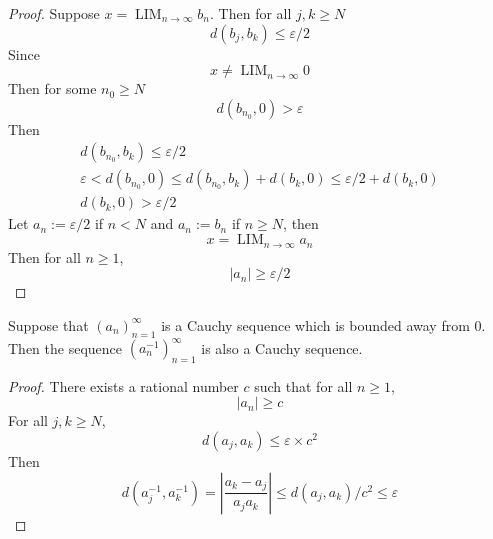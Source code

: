 \documentclass{blog}
\DeclareMathOperator{\LIM}{LIM}
\begin{document}
\begin{proof}
  Suppose $x = \LIM_{n \to \infty} b_{n}$.
  Then for all $j, k \geq N$
  \begin{equation*}
    d(b_{j}, b_{k}) \leq \varepsilon / 2
  \end{equation*}
  Since
  \begin{equation*}
    x \neq \LIM_{n \to \infty} 0
  \end{equation*}
  Then for some $n_{0} \geq N$
  \begin{equation*}
    d(b_{n_{0}}, 0) > \varepsilon
  \end{equation*}
  Then
  \begin{gather*}
    d(b_{n_{0}}, b_{k}) \leq \varepsilon / 2 \\
    \varepsilon < d(b_{n_{0}}, 0) \leq d(b_{n_{0}}, b_{k}) + d(b_{k}, 0)
    \leq \varepsilon / 2 + d(b_{k}, 0) \\
    d(b_{k}, 0) > \varepsilon / 2
  \end{gather*}
  Let $a_{n} := \varepsilon / 2$ if $n < N$ and $a_{n} := b_{n}$ if $n \geq N$, then
  \begin{equation*}
    x = \LIM_{n \to \infty} a_{n}
  \end{equation*}
  Then for all $n \geq 1$,
  \begin{equation*}
    |a_{n}| \geq \varepsilon / 2
  \end{equation*}
\end{proof}

\begin{lemma}
  Suppose that $(a_{n})_{n = 1}^{\infty}$ is a Cauchy sequence which is bounded away from 0.
  Then the sequence $(a_{n}^{-1})_{n = 1}^{\infty}$ is also a Cauchy sequence.
\end{lemma}

\begin{proof}
  There exists a rational number $c$ such that for all $n \geq 1$,
  \begin{equation*}
    |a_{n}| \geq c
  \end{equation*}
  For all $j, k \geq N$,
  \begin{equation*}
    d(a_{j}, a_{k}) \leq \varepsilon \times c^{2}
  \end{equation*}
  Then
  \begin{equation*}
    d(a_{j}^{-1}, a_{k}^{-1}) = \left| \frac{a_{k} - a_{j}}{a_{j} a_{k}} \right|
    \leq d(a_{j}, a_{k}) / c^{2} \leq \varepsilon
  \end{equation*}
\end{proof}
\end{document}
